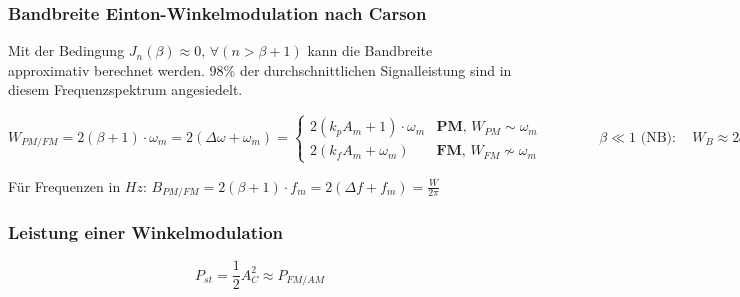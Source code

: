 \subsubsection{Bandbreite Einton-Winkelmodulation nach Carson}
	Mit der Bedingung $J_n(\beta) \approx 0, \,\forall (n > \beta + 1)$ kann die Bandbreite approximativ berechnet werden. 98\% der durchschnittlichen Signalleistung sind in diesem Frequenzspektrum angesiedelt. 

	\begin{center}
		$\boxed{W_{PM/FM} = 2(\beta + 1) \cdot \omega_m} = 2(\Delta \omega + \omega_m) =
		\begin{cases}
  			2(k_p A_m + 1)\cdot \omega_m & \textbf{PM},\, W_{PM} \sim \omega_m \\
  			2(k_f A_m + \omega_m) & \textbf{FM},\, W_{FM} \nsim \omega_m \end{cases} \qquad
  			\qquad \beta \ll 1 \text{ (NB)}: \quad W_{B} \approx 2 \omega_m
		$
	\end{center}
	F\"ur Frequenzen in $Hz$:
		$B_{PM/FM} = 2(\beta + 1) \cdot f_m = 2(\Delta f + f_m) = \frac{W}{2\pi}$

	\subsubsection{Leistung einer Winkelmodulation }
		$$P_{st} = \frac12 A_C^2 \approx P_{FM/AM}$$


